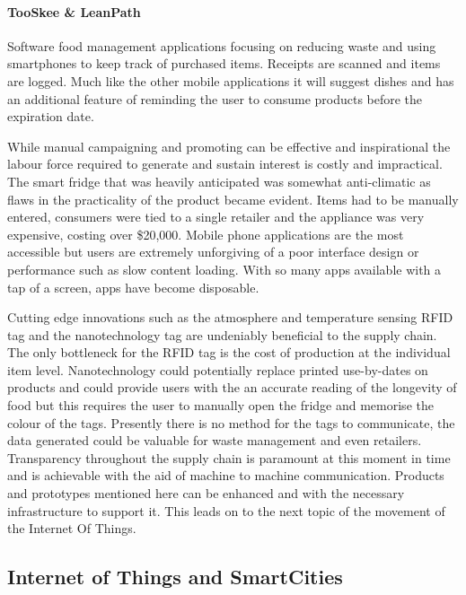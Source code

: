 \documentclass[a4paper, 11pt]{article}
\begin{document}
\paragraph{TooSkee \& LeanPath} Software food management applications focusing on reducing waste and using smartphones to keep track of purchased items. Receipts are scanned and items are logged. Much like the other mobile applications it will suggest dishes and has an additional feature of reminding the user to consume products before the expiration date.		

\vspace{\baselineskip}
While manual campaigning and promoting can be effective and inspirational the labour force required to generate and sustain interest is costly and impractical. The smart fridge that was heavily anticipated was somewhat anti-climatic as flaws in the practicality of the product became evident. Items had to be manually entered, consumers were tied to a single retailer and the appliance was very expensive, costing over \$20,000. Mobile phone applications are the most accessible but users are extremely unforgiving of a poor interface design or performance such as slow content loading. With so many apps available with a tap of a screen, apps have become disposable. 

Cutting edge innovations such as the atmosphere and temperature sensing RFID tag and the nanotechnology tag are undeniably beneficial to the supply chain. The only bottleneck for the RFID  tag is the cost of production at the individual item level. Nanotechnology could potentially replace printed use-by-dates on products  and could provide users with the an accurate reading of the longevity of food but this requires the user to manually open the fridge and memorise the colour of the tags. Presently there is no method for the tags to communicate, the data generated could be valuable for waste management and even retailers. Transparency throughout the supply chain is paramount at this moment in time and is achievable with the aid of machine to machine communication. Products and prototypes mentioned here can be enhanced and with the necessary infrastructure to support it. This leads on to the next topic of the movement of the Internet Of Things.


\vspace{\baselineskip}
\vspace{\baselineskip}
\vspace{\baselineskip}


\subsection{Internet of Things and SmartCities}
\end{document}
